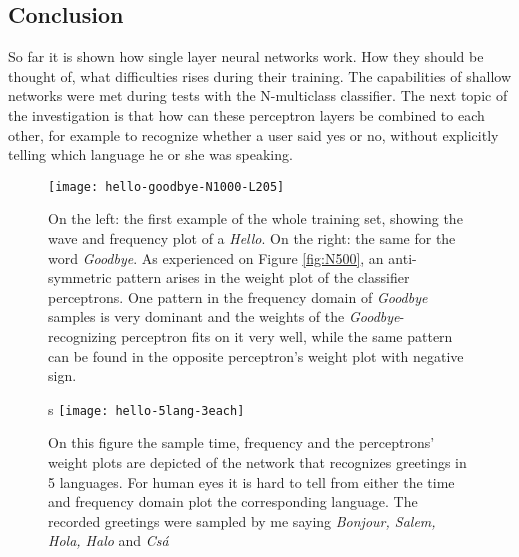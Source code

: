 \subsection{Conclusion}
So far it is shown how single layer neural networks work. How they should be thought of, what difficulties rises during their training. The capabilities of shallow networks were met during tests with the N-multiclass classifier. The next topic of the investigation is that how can these perceptron layers be combined to each other, for example to recognize whether a user said yes or no, without explicitly telling  which language he or she was speaking.

\begin{figure}
	\centering
	\texttt{[image: hello-goodbye-N1000-L205]}
	\caption{On the left: the first example of the whole training set, showing the wave and frequency plot of a \emph{Hello}. On the right: the same for the word \emph{Goodbye}. As experienced on Figure \ref{fig:N500}, an anti-symmetric pattern arises in the weight plot of the classifier perceptrons. One pattern in the frequency domain of \emph{Goodbye} samples is very dominant and the weights of the \emph{Goodbye}-recognizing perceptron fits on it very well, while the same pattern can be found in the opposite perceptron's weight plot with negative sign.}
	
	\label{fig:hello}
\end{figure}

\begin{figure}s
	\centering
	\texttt{[image: hello-5lang-3each]}
	\caption{On this figure the sample time, frequency and the perceptrons' weight plots are depicted of the network that recognizes greetings in 5 languages. For human eyes it is hard to tell from either the time and frequency domain plot the corresponding language. The recorded greetings were sampled by me saying \emph{Bonjour, Salem, Hola, Halo} and \emph{Csá}}
	
	\label{fig:hello5}
\end{figure}
